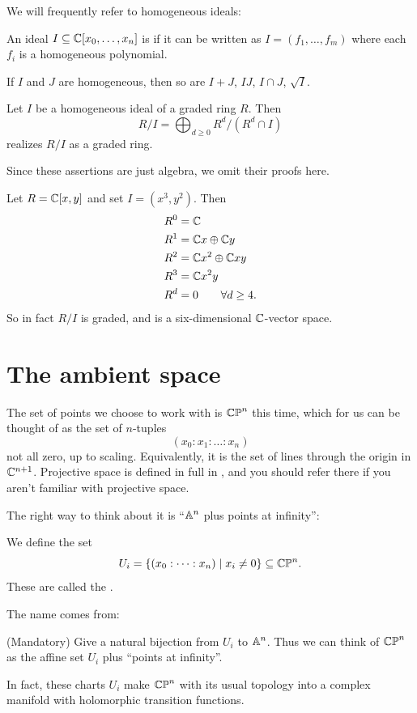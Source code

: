 We will frequently refer to homogeneous ideals:
\begin{definition}
	An ideal $I \subseteq \mathbb C[x_0, \dots, x_n]$ is 
	if it can be written as $I = (f_1, \dots, f_m)$
	where each $f_i$ is a homogeneous polynomial.
\end{definition}
\begin{remark}
	If $I$ and $J$ are homogeneous,
	then so are $I+J$, $IJ$, $I \cap J$, $\sqrt I$.
\end{remark}
\begin{lemma}
	Let $I$ be a homogeneous ideal of a graded ring $R$.
	Then
	\[ R/I = \bigoplus_{d \ge 0} R^d / (R^d \cap I) \]
	realizes $R/I$ as a graded ring.
\end{lemma}
Since these assertions are just algebra,
we omit their proofs here.
\begin{example}
	Let $R = \mathbb C[x,y]$ and set $I = (x^3, y^2)$. Then
	\begin{align*}
		R^0 &= \mathbb C \\
		R^1 &= \mathbb C x \oplus \mathbb C y \\
		R^2 &= \mathbb C x^2 \oplus \mathbb C xy \\
		R^3 &= \mathbb C x^2y \\
		R^d &= 0 \qquad \forall d \ge 4.
	\end{align*}
	So in fact $R/I$ is graded, and is a six-dimensional $\mathbb C$-vector space.
\end{example}


\section{The ambient space}
The set of points we choose to work with is $\mathbb{CP}^n$ this time,
which for us can be thought of as the set of $n$-tuples
\[ \left( x_0 : x_1 : \dots : x_n \right) \]
not all zero, up to scaling.
Equivalently, it is the set of lines through the origin in $\mathbb C^{n+1}$.
Projective space is defined in full in ,
and you should refer there if you aren't familiar with projective space.

The right way to think about it is ``$\mathbb A^n$ plus points at infinity'':
\begin{definition}
	We define the set
	\[ U_i = \left\{ (x_0 : \dots : x_n) \mid x_i \neq 0  \right\}
		\subseteq \mathbb{CP}^n. \]
	These are called the .
\end{definition}
The name comes from:
\begin{exercise}
	(Mandatory)
	Give a natural bijection from $U_i$ to $\mathbb A^n$.
	Thus we can think of $\mathbb{CP}^n$ as the affine set $U_i$
	plus ``points at infinity''.
\end{exercise}
\begin{remark}
	In fact, these charts $U_i$ make $\mathbb{CP}^n$ with its usual topology
	into a complex manifold with holomorphic transition functions.
\end{remark}

